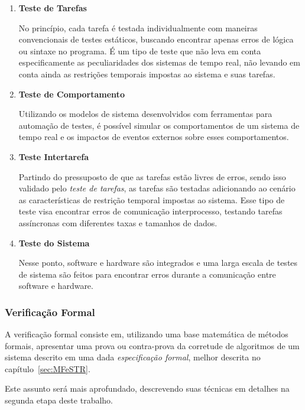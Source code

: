 \begin{enumerate}
\item \textbf{Teste de Tarefas}

No princípio, cada tarefa é testada individualmente com maneiras convencionais de testes estáticos, buscando encontrar
apenas erros de lógica ou sintaxe no programa. É um tipo de teste que não leva em conta especificamente as peculiaridades
dos sistemas de tempo real, não levando em conta ainda as restrições temporais impostas ao sistema e suas tarefas.


\item \textbf{Teste de Comportamento}

Utilizando os modelos de sistema desenvolvidos com ferramentas para automação de testes, é possível simular os comportamentos
de um sistema de tempo real e os impactos de eventos externos sobre esses comportamentos.


\item \textbf{Teste Intertarefa}

Partindo do pressuposto de que as tarefas estão livres de erros, sendo isso validado pelo \textit{teste de tarefas}, as tarefas são
testadas adicionando ao cenário as características de restrição temporal impostas ao sistema. Esse tipo de teste visa encontrar
erros de comunicação interprocesso, testando tarefas assíncronas com diferentes taxas e tamanhos de dados.


\item \textbf{Teste do Sistema}

Nesse ponto, software e hardware são integrados e uma larga escala de testes de sistema são feitos para encontrar erros durante
a comunicação entre software e hardware.

\end{enumerate}

\subsubsection{Verificação Formal}
A verificação formal consiste em, utilizando uma base matemática de métodos formais, apresentar uma prova ou
contra-prova da corretude de algoritmos de um sistema descrito em uma dada \textit{especificação formal}, melhor
descrita no capítulo~\ref{sec:MFeSTR}.

Este assunto será mais aprofundado, descrevendo suas técnicas em detalhes na segunda etapa deste trabalho.

